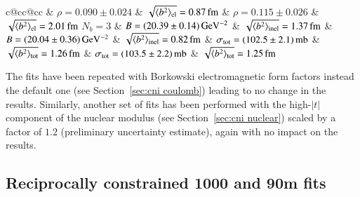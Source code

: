 \begin{table}
\begin{center}
\begin{tabular}{c@{\hskip20pt}cc@{\hskip20pt}cc}
 			& $\rho = 0.090 \pm 0.024$ & $\sqrt{\langle b^2\rangle_{\rm el}} = 0.87\,{\rm fm}$						& $\rho = 0.115 \pm 0.026$ & $\sqrt{\langle b^2\rangle_{\rm el}} = 2.01\,{\rm fm}$						\cr
$N_b = 3$	& $B = (20.39 \pm 0.14)\,{\rm GeV^{-2}}$ & $\sqrt{\langle b^2\rangle_{\rm inel}} = 1.37\,{\rm fm}$		& $B = (20.04 \pm 0.36)\,{\rm GeV^{-2}}$ & $\sqrt{\langle b^2\rangle_{\rm inel}} = 0.82\,{\rm fm}$		\cr
			& $\sigma_{\rm tot} = (102.5 \pm 2.1)\,{\rm mb}$ & $\sqrt{\langle b^2\rangle_{\rm tot}} = 1.26\,{\rm fm}$	& $\sigma_{\rm tot} = (103.5 \pm 2.2)\,{\rm mb}$ & $\sqrt{\langle b^2\rangle_{\rm tot}} = 1.25\,{\rm fm}$	\cr\hline
\hline
\end{tabular}
\end{center}
\end{table}

The fits have been repeated with Borkowski electromagnetic form factors instead the default one (see Section~\ref{sec:cni coulomb}) leading to no change in the results. Similarly, another set of fits has been performed with the high-$|t|$ component of the nuclear modulus (see Section~\ref{sec:cni nuclear}) scaled by a factor of $1.2$ (preliminary uncertainty estimate), again with no impact on the results.



\subsection{Reciprocally constrained 1000 and 90m fits}
\label{sec:cni reciprocal fits}

